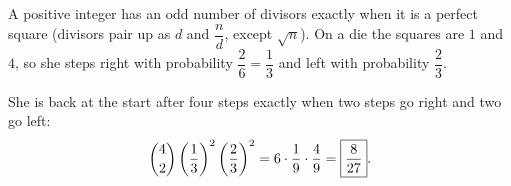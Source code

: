 A positive integer has an odd number of divisors exactly when it is a perfect square (divisors pair up as $d$ and $\dfrac {n}{d}$, except $\sqrt n$). On a die the squares are $1$ and $4$, so she steps right with probability $\dfrac{2}{6}=\dfrac{1}{3}$ and left with probability $\dfrac{2}{3}$.

She is back at the start after four steps exactly when two steps go right and two go left:
\[
\dbinom42\left(\dfrac{1}{3}\right)^2\left(\dfrac{2}{3}\right)^2=6\cdot\dfrac{1}{9}\cdot\dfrac{4}{9}=\boxed{\dfrac{8}{27}}.
\]
